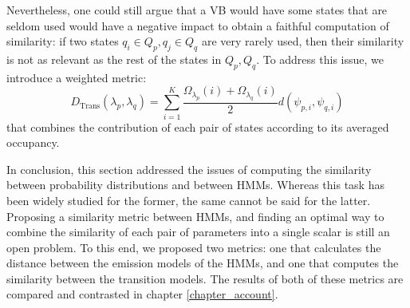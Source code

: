 \documentclass[../main.tex]{subfiles}
\begin{document}
\par Nevertheless, one could still argue that a VB would have some states that are seldom used would have a negative impact to obtain a faithful computation of similarity: if two states $q_i \in Q_p, q_j \in Q_q$ are very rarely used, then their similarity is not as relevant as the rest of the states in $Q_p, Q_q$. To address this issue, we introduce a weighted metric:
\begin{equation} \label{eq:hmmdist}
D_{\text{Trans}}(\lambda_p, \lambda_q) = \sum_{i=1}^K \frac{\Omega_{\lambda_p}(i) + \Omega_{\lambda_q}(i)}{2} d(\psi_{p, i}, \psi_{q, i})
\end{equation}
that combines the contribution of each pair of states according to its averaged occupancy.
\par In conclusion, this section addressed the issues of computing the similarity between probability distributions and between HMMs. Whereas this task has been widely studied for the former, the same cannot be said for the latter. Proposing a similarity metric between HMMs, and finding an optimal way to combine the similarity of each pair of parameters into a single scalar is still an open problem. To this end, we proposed two metrics: one that calculates the distance between the emission models of the HMMs, and one that computes the similarity between the transition models. The results of both of these metrics are compared and contrasted in chapter \ref{chapter_account}.
\end{document}
